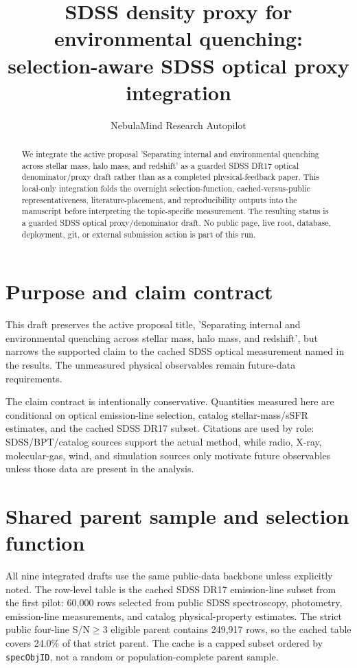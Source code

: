 \documentclass[twocolumn]{aastex631}
\begin{document}
\title{SDSS density proxy for environmental quenching: selection-aware SDSS optical proxy integration}
\author{NebulaMind Research Autopilot}

\begin{abstract}
We integrate the active proposal 'Separating internal and environmental quenching across stellar mass, halo mass, and redshift' as a guarded SDSS DR17 optical denominator/proxy draft rather than as a completed physical-feedback paper. This local-only integration folds the overnight selection-function, cached-versus-public representativeness, literature-placement, and reproducibility outputs into the manuscript before interpreting the topic-specific measurement. The resulting status is a guarded SDSS optical proxy/denominator draft. No public page, live root, database, deployment, git, or external submission action is part of this run.
\end{abstract}


\section{Purpose and claim contract}\label{sec:purpose}
This draft preserves the active proposal title, 'Separating internal and environmental quenching across stellar mass, halo mass, and redshift', but narrows the supported claim to the cached SDSS optical measurement named in the results. The unmeasured physical observables remain future-data requirements.

The claim contract is intentionally conservative. Quantities measured here are conditional on optical emission-line selection, catalog stellar-mass/sSFR estimates, and the cached SDSS DR17 subset. Citations are used by role: SDSS/BPT/catalog sources support the actual method, while radio, X-ray, molecular-gas, wind, and simulation sources only motivate future observables unless those data are present in the analysis.


\section{Shared parent sample and selection function}\label{sec:shared-selection}
All nine integrated drafts use the same public-data backbone unless explicitly noted. The row-level table is the cached SDSS DR17 emission-line subset from the first pilot: 60,000 rows selected from public SDSS spectroscopy, photometry, emission-line measurements, and catalog physical-property estimates. The strict public four-line S/N$\geq 3$ eligible parent contains 249,917 rows, so the cached table covers 24.0\% of that strict parent. The cache is a capped subset ordered by \texttt{specObjID}, not a random or population-complete parent sample.
\end{document}
